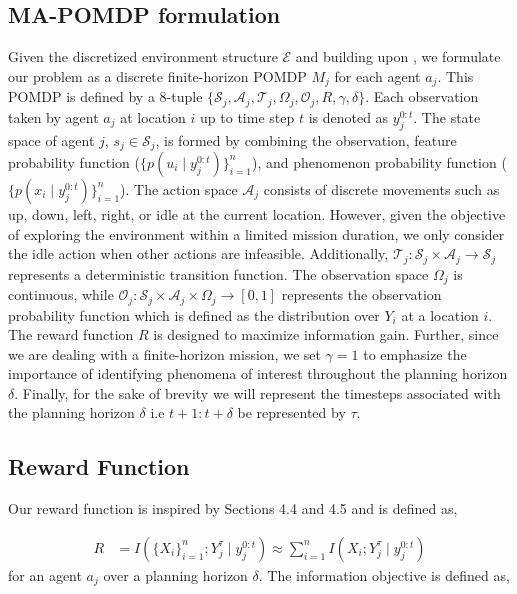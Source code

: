 \documentclass[letterpaper, 10 pt, conference]{IEEEConference}
\begin{document}
\subsection{MA-POMDP formulation}
Given the discretized environment structure $\mathcal{E}$ and building upon \cite{ayton2017}, we formulate our problem as a discrete finite-horizon POMDP $M_j$ for each agent $a_j$. This POMDP is defined by a 8-tuple $\{\mathcal{S}_j, \mathcal{A}_j, \mathcal{T}_j, \Omega_j, \mathcal{O}_j, R, \gamma, \delta\}$. Each observation taken by agent $a_j$ at location $i$ up to time step $t$ is denoted as $y_j^{0:t}$. The state space of agent $j$, $s_j \in \mathcal{S}_j$, is formed by combining the observation, feature probability function ($\lbrace p(u_i \mid y_j^{0:t}) \rbrace_{i=1}^{n}$), and phenomenon probability function ($\lbrace p(x_i \mid y_j^{0:t}) \rbrace_{i=1}^{n}$). The action space $\mathcal{A}_j$ consists of discrete movements such as up, down, left, right, or idle at the current location. However, given the objective of exploring the environment within a limited mission duration, we only consider the idle action when other actions are infeasible. Additionally, $\mathcal{T}_j: \mathcal{S}_j \times \mathcal{A}_j \rightarrow \mathcal{S}_j$ represents a deterministic transition function. The observation space $\Omega_j$ is continuous, while $\mathcal{O}_j : \mathcal{S}_j \times \mathcal{A}_j \times \Omega_j \rightarrow [0, 1]$ represents the observation probability function which is defined as the distribution over $Y_i$ at a location $i$. The reward function $R$ is designed to maximize information gain. Further, since we are dealing with a finite-horizon mission, we set $\gamma = 1$ to emphasize the importance of identifying phenomena of interest throughout the planning horizon $\delta$. Finally, for the sake of brevity we will represent the timesteps associated with the planning horizon $\delta$ i.e $t+1:t+\delta$ be represented by $\tau$.

\subsection{Reward Function}
Our reward function is inspired by \cite{ayton2017} Sections 4.4 and 4.5 and is defined as,

\begin{align*}
    R &= I(\lbrace X_i \rbrace_{i=1}^n ; Y_j^{\tau} \mid y_j^{0:t})
    \approx \sum_{i=1}^n I(X_i ; Y_j^{\tau} \mid y_j^{0:t})
\end{align*}
%
for an agent $a_j$ over a planning horizon $\delta$. The information objective is defined as, 
\end{document}
